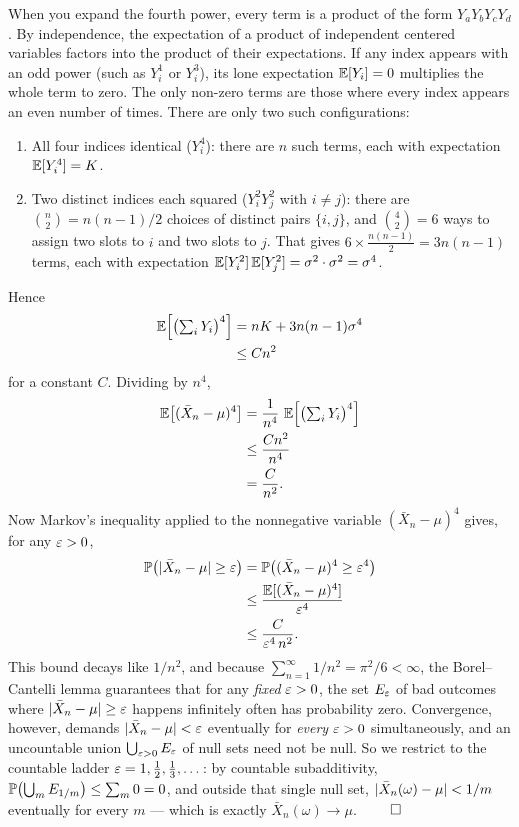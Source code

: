 \begin{whybox}
When you expand the fourth power, every term is a product of the form $Y_a Y_b Y_c Y_d$. By independence, the expectation of a product of independent centered variables factors into the product of their expectations. If any index appears with an odd power (such as $Y_i^1$ or $Y_i^3$), its lone expectation $\E[Y_i]=0$ multiplies the whole term to zero. The only non-zero terms are those where every index appears an even number of times. There are only two such configurations:
\begin{enumerate}
  \item All four indices identical ($Y_i^4$): there are $n$ such terms, each with expectation $\E[Y_i^4] = K$.
  \item Two distinct indices each squared ($Y_i^2 Y_j^2$ with $i \ne j$): there are $\binom{n}{2} = n(n-1)/2$ choices of distinct pairs $\{i,j\}$, and $\binom{4}{2} = 6$ ways to assign two slots to $i$ and two slots to $j$. That gives $6 \times \frac{n(n-1)}{2} = 3n(n-1)$ terms, each with expectation $\E[Y_i^2]\E[Y_j^2] = \sigma^2 \cdot \sigma^2 = \sigma^4$.
\end{enumerate}
Hence
\begin{align*}
  \E\Bigl[\bigl(\textstyle\sum_i Y_i\bigr)^4\Bigr] &= nK + 3n(n-1)\sigma^4 \\
  &\le Cn^2
\end{align*}
for a constant $C$. Dividing by $n^4$,
\begin{align*}
  \E\bigl[(\bar X_n - \mu)^4\bigr] &= \frac{1}{n^4}\,\E\Bigl[\bigl(\textstyle\sum_i Y_i\bigr)^4\Bigr] \\
  &\le \frac{Cn^2}{n^4} \\
  &= \frac{C}{n^2}.
\end{align*}
Now Markov's inequality applied to the nonnegative variable $(\bar X_n-\mu)^4$ gives, for any $\eps>0$,
\begin{align*}
  \P\bigl(\abs{\bar X_n - \mu} \ge \eps\bigr) &= \P\bigl((\bar X_n-\mu)^4 \ge \eps^4\bigr) \\
  &\le \frac{\E[(\bar X_n-\mu)^4]}{\eps^4} \\
  &\le \frac{C}{\eps^4\,n^2}.
\end{align*}
This bound decays like $1/n^2$, and because $\sum_{n=1}^{\infty} 1/n^2 = \pi^2/6 < \infty$, the Borel--Cantelli lemma guarantees that for any \emph{fixed} $\eps > 0$, the set $E_\eps$ of bad outcomes where $\abs{\bar X_n - \mu} \ge \eps$ happens infinitely often has probability zero. Convergence, however, demands $\abs{\bar X_n - \mu} < \eps$ eventually for \emph{every} $\eps > 0$ simultaneously, and an uncountable union $\bigcup_{\eps > 0} E_\eps$ of null sets need not be null. So we restrict to the countable ladder $\eps = 1, \tfrac12, \tfrac13, \dots$: by countable subadditivity, $\P\bigl(\bigcup_{m} E_{1/m}\bigr) \le \sum_m 0 = 0$, and outside that single null set, $\abs{\bar X_n(\omega) - \mu} < 1/m$ eventually for every $m$ --- which is exactly $\bar X_n(\omega) \to \mu$. $\qed$
\end{whybox}

